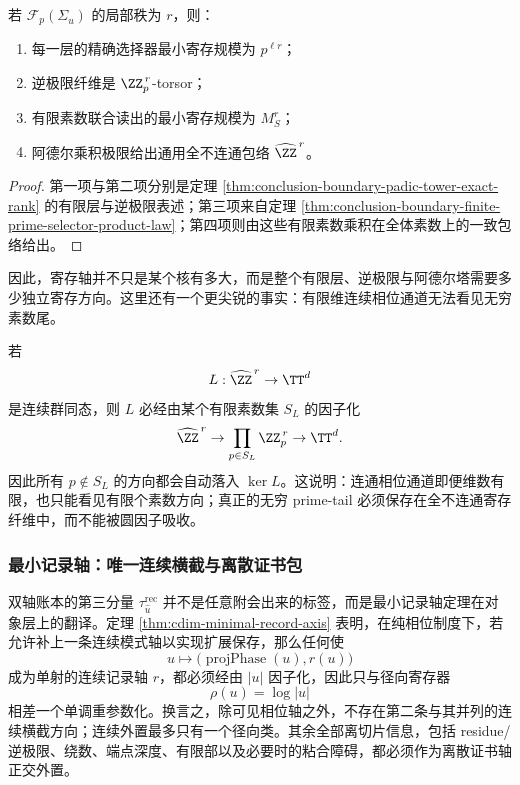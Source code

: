 \begin{proposition}[寄存纤维塔的预算律]\label{prop:typed-address-biaxial-completion-register-fiber-budget}
若 \(\mathcal F_p(\Sigma_{\hat u})\) 的局部秩为 \(r\)，则：
\begin{enumerate}
  \item 每一层的精确选择器最小寄存规模为 \(p^{\ell r}\)；
  \item 逆极限纤维是 \(\ZZ_p^{\,r}\)-torsor；
  \item 有限素数联合读出的最小寄存规模为 \(M_S^r\)；
  \item 阿德尔乘积极限给出通用全不连通包络 \(\widehat{\ZZ}^{\,r}\)。
\end{enumerate}
\end{proposition}
\begin{proof}
第一项与第二项分别是定理 \ref{thm:conclusion-boundary-padic-tower-exact-rank} 的有限层与逆极限表述；第三项来自定理 \ref{thm:conclusion-boundary-finite-prime-selector-product-law}；第四项则由这些有限素数乘积在全体素数上的一致包络给出。
\end{proof}

因此，寄存轴并不只是某个核有多大，而是整个有限层、逆极限与阿德尔塔需要多少独立寄存方向。这里还有一个更尖锐的事实：有限维连续相位通道无法看见无穷素数尾。

\begin{remark}[有限维连续相位通道的结构性失明]\label{rem:typed-address-biaxial-completion-prime-tail-blind}
若
\[
L:\widehat{\ZZ}^{\,r}\to \TT^d
\]
是连续群同态，则 \(L\) 必经由某个有限素数集 \(S_L\) 的因子化
\[
\widehat{\ZZ}^{\,r}\to \prod_{p\in S_L}\ZZ_p^{\,r}\to \TT^d.
\]
因此所有 \(p\notin S_L\) 的方向都会自动落入 \(\ker L\)。这说明：连通相位通道即便维数有限，也只能看见有限个素数方向；真正的无穷 prime-tail 必须保存在全不连通寄存纤维中，而不能被圆因子吸收。
\end{remark}

\subsubsection{最小记录轴：唯一连续横截与离散证书包}\label{subsubsec:typed-address-biaxial-completion-minimal-recorder}
双轴账本的第三分量 \(\tau^{\mathrm{rec}}_{\hat u}\) 并不是任意附会出来的标签，而是最小记录轴定理在对象层上的翻译。定理 \ref{thm:cdim-minimal-record-axis} 表明，在纯相位制度下，若允许补上一条连续模式轴以实现扩展保存，那么任何使
\[
u\longmapsto \bigl(\operatorname{projPhase}(u),r(u)\bigr)
\]
成为单射的连续记录轴 \(r\)，都必须经由 \(|u|\) 因子化，因此只与径向寄存器
\[
\rho(u)=\log|u|
\]
相差一个单调重参数化。换言之，除可见相位轴之外，不存在第二条与其并列的连续横截方向；连续外置最多只有一个径向类。其余全部离切片信息，包括 residue/逆极限、绕数、端点深度、有限部以及必要时的粘合障碍，都必须作为离散证书轴正交外置。

